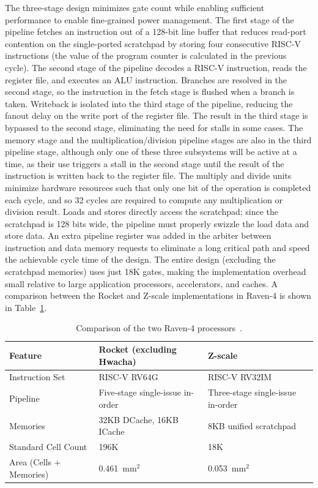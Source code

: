\documentclass[graybox]{svmult}
\begin{document}
The three-stage design minimizes gate count while enabling sufficient performance to enable fine-grained power management.
The first stage of the pipeline fetches an instruction out of a 128-bit line buffer that reduces read-port contention on the single-ported scratchpad by storing four consecutive RISC-V instructions (the value of the program counter is calculated in the previous cycle).
The second stage of the pipeline decodes a RISC-V instruction, reads the register file, and executes an ALU instruction.
Branches are resolved in the second stage, so the instruction in the fetch stage is flushed when a branch is taken.
Writeback is isolated into the third stage of the pipeline, reducing the fanout delay on the write port of the register file.
The result in the third stage is bypassed to the second stage, eliminating the need for stalls in some cases.
The memory stage and the multiplication/division pipeline stages are also in the third pipeline stage, although only one of these three subsystems will be active at a time, as their use triggers a stall in the second stage until the result of the instruction is written back to the register file.
The multiply and divide units minimize hardware resources such that only one bit of the operation is completed each cycle, and so 32 cycles are required to compute any multiplication or division result.
Loads and stores directly access the scratchpad; since the scratchpad is 128 bits wide, the pipeline must properly swizzle the load data and store data.
An extra pipeline register was added in the arbiter between instruction and data memory requests to eliminate a long critical path and speed the achievable cycle time of the design.
The entire design (excluding the scratchpad memories) uses just 18K gates, making the implementation overhead small relative to large application processors, accelerators, and caches.
A comparison between the Rocket and Z-scale implementations in Raven-4 is shown in Table~\ref{tab:raven4-processors}.

\begin{table}[]
\footnotesize
\renewcommand{\arraystretch}{1.2}
\centering
\begin{tabular}{@{}lll@{}}
\toprule
\textbf{Feature} & \textbf{Rocket (excluding Hwacha)} & \textbf{Z-scale} \\
\midrule
{Instruction Set} & RISC-V RV64G & RISC-V RV32IM\\
{Pipeline} & Five-stage single-issue in-order & Three-stage single-issue in-order\\
{Memories} & 32KB DCache, 16KB ICache & 8KB unified scratchpad \\
{Standard Cell Count} & 196K & 18K \\
{Area (Cells + Memories)} & \SI{0.461}{\milli\meter}$^2$ & \SI{0.053}{\milli\meter}$^2$ \\
\bottomrule
\end{tabular}
\caption{Comparison of the two Raven-4 processors~\cite{Keller2017}.}
\label{tab:raven4-processors}
\end{table}
\end{document}
